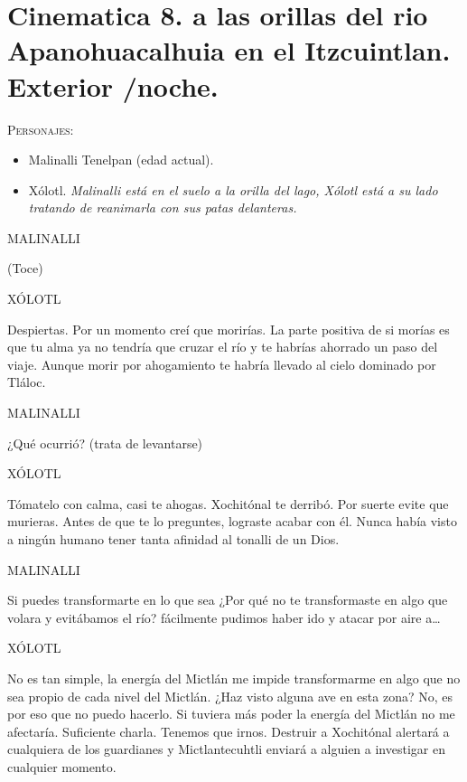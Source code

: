 \documentclass[11pt,letterpaper]{article}
\begin{document}
\section{Cinematica 8. a las orillas del rio Apanohuacalhuia en el Itzcuintlan. Exterior /noche.}
 \textsc{Personajes}:
 \begin{itemize}
 	\item Malinalli Tenelpan (edad actual).
	\item Xólotl.
\textit{Malinalli está en el suelo a la orilla del lago, Xólotl está a su lado tratando de reanimarla con sus patas delanteras.}
 \end{itemize}
 
\begin{center}
MALINALLI
\\
\par
(Toce)
\\
\par
XÓLOTL
\\
\par
Despiertas. Por un momento creí que morirías. La parte positiva de si morías es que tu alma ya no tendría que cruzar el río y te habrías ahorrado un paso del viaje. Aunque morir por ahogamiento te habría llevado al cielo dominado por Tláloc.
\\
\par
MALINALLI
\\
\par
¿Qué ocurrió? (trata de levantarse)
\\
\par
XÓLOTL
\\
\par
Tómatelo con calma, casi te ahogas. Xochitónal te derribó. Por suerte evite que murieras. Antes de que te lo preguntes, lograste acabar con él. Nunca había visto a ningún humano tener tanta afinidad al tonalli de un Dios. 
\\
\par
MALINALLI
\\
\par
Si puedes transformarte en lo que sea ¿Por qué no te transformaste en algo que volara y evitábamos el río? fácilmente pudimos haber ido y atacar por aire a…
\\
\par
XÓLOTL
\\
\par
No es tan simple, la energía del Mictlán me impide transformarme en algo que no sea propio de cada nivel del Mictlán. ¿Haz visto alguna ave en esta zona? No, es por eso que no puedo hacerlo. Si tuviera más poder la energía del Mictlán no me afectaría. Suficiente charla. Tenemos que irnos. Destruir a Xochitónal alertará a cualquiera de los guardianes y Mictlantecuhtli enviará a alguien a investigar en cualquier momento.

\end{center}
\end{document}

